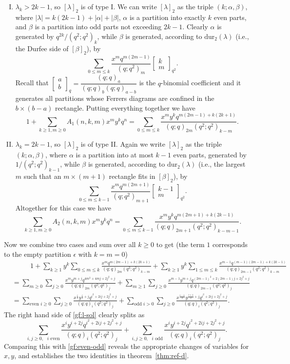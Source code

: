 \documentclass[11pt,reqno]{amsart}
\numberwithin{equation}{section}
\theoremstyle{plain}
\theoremstyle{definition}
\theoremstyle{named}
\newcommand{\abs}[1]{\left|#1\right|}
\newcommand{\qbin}[3]{\left[\begin{matrix} #1 \\ #2 \end{matrix} \right]_{#3}}
\def\la{\lambda}
\def\dur{\mathrm{dur}}
\begin{document}
\begin{enumerate}[(I)]
	\item $\la_k>2k-1$, so $[\la]_2$ is of type I. We can write $[\la]_2$ as the triple $(k;\alpha,\beta)$, where $\abs{\la}=k(2k-1)+\abs{\alpha}+\abs{\beta}$, $\alpha$ is a partition into exactly $k$ even parts, and $\beta$ is a partition into odd parts not exceeding $2k-1$. Clearly $\alpha$ is generated by $q^{2k}/(q^2;q^2)_k$, while $\beta$ is generated, according to $\dur_2(\la)$ (i.e., the Durfee side of $[\beta]_2$), by
	$$\sum_{0\le m\le k}\frac{x^mq^{m(2m-1)}}{(q;q^2)_m}\qbin{k}{m}{q^2}.$$
	Recall that $\qbin{a}{b}{q}=\dfrac{(q;q)_a}{(q;q)_b(q;q)_{a-b}}$ is the $q$-binomial coefficient and it generates all partitions whose Ferrers diagrams are confined in the $b\times(b-a)$ rectangle. Putting everything together we have
	$$1+\sum_{k\ge 1,m\ge 0}A_1(n,k,m)x^my^kq^n=\sum_{0\le m\le k}\frac{x^my^kq^{m(2m-1)+k(2k+1)}}{(q;q)_{2m}(q^2;q^2)_{k-m}}.$$
	\item $\la_k=2k-1$, so $[\la]_2$ is of type II. Again we write $[\la]_2$ as the triple $(k;\alpha,\beta)$, where $\alpha$ is a partition into at most $k-1$ even parts, generated by $1/(q^2;q^2)_{k-1}$, while $\beta$ is generated, according to $\dur_2(\la)$ (i.e., the largest $m$ such that an $m\times (m+1)$ rectangle fits in $[\beta]_2$), by
	$$\sum_{0\le m\le k-1}\frac{x^mq^{m(2m+1)}}{(q;q^2)_{m+1}}\qbin{k-1}{m}{q^2}.$$
	Altogether for this case we have
	$$\sum_{k\ge 1,m\ge 0}A_2(n,k,m)x^my^kq^n=\sum_{0\le m\le k-1}\frac{x^my^kq^{m(2m+1)+k(2k-1)}}{(q;q)_{2m+1}(q^2;q^2)_{k-m-1}}.$$
\end{enumerate}
Now we combine two cases and sum over all $k\ge 0$ to get (the term $1$ corresponds to the empty partition $\epsilon$ with $k=m=0$)
\begin{align}
&\phantom{==} 1+\sum_{k\ge 1}y^k \sum_{0\le m\le k}\frac{x^mq^{m(2m-1)+k(2k+1)}}{(q;q)_{2m}(q^2;q^2)_{k-m}}+\sum_{k\ge 1}y^k \sum_{1\le m\le k}\frac{x^{m-1}q^{(m-1)(2m-1)+k(2k-1)}}{(q;q)_{2m-1}(q^2;q^2)_{k-m}} \nonumber \\
&=\sum_{m\ge 0}\sum_{j\ge 0}\frac{x^my^{m+j}q^{4m^2+4mj+2j^2+j}}{(q;q)_{2m}(q^2;q^2)_j}+\sum_{m\ge 1}\sum_{j\ge 0}\frac{x^{m-1}y^{m+j}q^{(2m-1)^2+2(2m-1)j+2j^2+j}}{(q;q)_{2m-1}(q^2;q^2)_j} \label{gf:two cases} \\
&=\sum_{\text{even }i\ge 0}\sum_{j\ge 0}\frac{x^{\frac{i}{2}}y^{\frac{i}{2}+j}q^{i^2+2ij+2j^2+j}}{(q;q)_i(q^2;q^2)_j}+\sum_{\text{odd }i> 0}\sum_{j\ge 0}\frac{x^{\frac{i-1}{2}}y^{\frac{i+1}{2}+j}q^{i^2+2ij+2j^2+j}}{(q;q)_i(q^2;q^2)_j}.\label{gf:even-odd}
\end{align}
The right hand side of \eqref{gf:l-sol} clearly splits as
$$\sum_{i,j\ge 0,\text{ $i$ even}}\frac{x^iy^{i+2j}q^{i^2+2ij+2j^2+j}}{(q;q)_i(q^2;q^2)_j}+\sum_{i,j\ge 0,\text{ $i$ odd}}\frac{x^iy^{i+2j}q^{i^2+2ij+2j^2+j}}{(q;q)_i(q^2;q^2)_j}.$$
Comparing this with \eqref{gf:even-odd} reveals the appropriate changes of variables for $x,y$, and establishes the two identities in theorem~\ref{thm:ref-d}.
\end{document}
